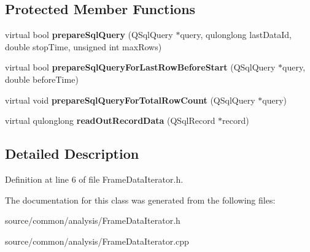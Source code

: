 \subsection*{Protected Member Functions}
\begin{DoxyCompactItemize}
\item 
\hypertarget{class_picto_1_1_frame_data_iterator_a55c780be9455b9a9f57f19f1b47a75b0}{virtual bool {\bfseries prepare\-Sql\-Query} (Q\-Sql\-Query $\ast$query, qulonglong last\-Data\-Id, double stop\-Time, unsigned int max\-Rows)}\label{class_picto_1_1_frame_data_iterator_a55c780be9455b9a9f57f19f1b47a75b0}

\item 
\hypertarget{class_picto_1_1_frame_data_iterator_afc1c1cf55a761e04a5550b806ef3fe29}{virtual bool {\bfseries prepare\-Sql\-Query\-For\-Last\-Row\-Before\-Start} (Q\-Sql\-Query $\ast$query, double before\-Time)}\label{class_picto_1_1_frame_data_iterator_afc1c1cf55a761e04a5550b806ef3fe29}

\item 
\hypertarget{class_picto_1_1_frame_data_iterator_aa93d82e24f0048094961ac3283ed5eb8}{virtual void {\bfseries prepare\-Sql\-Query\-For\-Total\-Row\-Count} (Q\-Sql\-Query $\ast$query)}\label{class_picto_1_1_frame_data_iterator_aa93d82e24f0048094961ac3283ed5eb8}

\item 
\hypertarget{class_picto_1_1_frame_data_iterator_abc72db1939f777fd004ee08baf8f7874}{virtual qulonglong {\bfseries read\-Out\-Record\-Data} (Q\-Sql\-Record $\ast$record)}\label{class_picto_1_1_frame_data_iterator_abc72db1939f777fd004ee08baf8f7874}

\end{DoxyCompactItemize}


\subsection{Detailed Description}


Definition at line 6 of file Frame\-Data\-Iterator.\-h.



The documentation for this class was generated from the following files\-:\begin{DoxyCompactItemize}
\item 
source/common/analysis/Frame\-Data\-Iterator.\-h\item 
source/common/analysis/Frame\-Data\-Iterator.\-cpp\end{DoxyCompactItemize}
